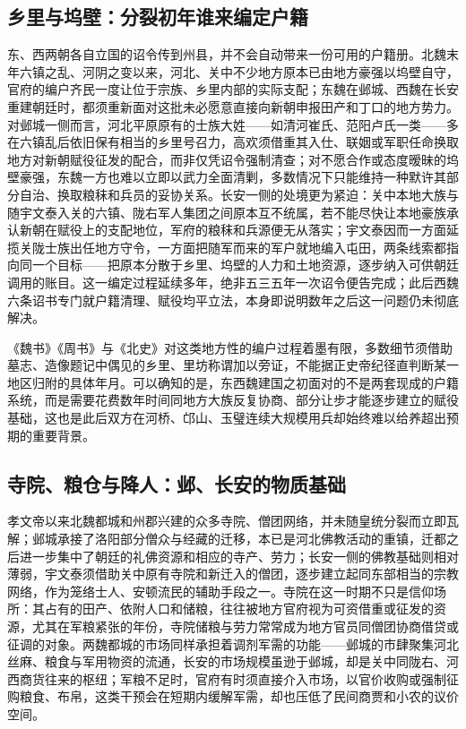 \subsection{乡里与坞壁：分裂初年谁来编定户籍}

东、西两朝各自立国的诏令传到州县，并不会自动带来一份可用的户籍册。北魏末年六镇之乱、河阴之变以来，河北、关中不少地方原本已由地方豪强以坞壁自守，官府的编户齐民一度让位于宗族、乡里内部的实际支配；东魏在邺城、西魏在长安重建朝廷时，都须重新面对这批未必愿意直接向新朝申报田产和丁口的地方势力。对邺城一侧而言，河北平原原有的士族大姓——如清河崔氏、范阳卢氏一类——多在六镇乱后依旧保有相当的乡里号召力，高欢须借重其入仕、联姻或军职任命换取地方对新朝赋役征发的配合，而非仅凭诏令强制清查；对不愿合作或态度暧昧的坞壁豪强，东魏一方也难以立即以武力全面清剿，多数情况下只能维持一种默许其部分自治、换取粮秣和兵员的妥协关系。长安一侧的处境更为紧迫：关中本地大族与随宇文泰入关的六镇、陇右军人集团之间原本互不统属，若不能尽快让本地豪族承认新朝在赋役上的支配地位，军府的粮秣和兵源便无从落实；宇文泰因而一方面延揽关陇士族出任地方守令，一方面把随军而来的军户就地编入屯田，两条线索都指向同一个目标——把原本分散于乡里、坞壁的人力和土地资源，逐步纳入可供朝廷调用的账目。这一编定过程延续多年，绝非五三五年一次诏令便告完成；此后西魏六条诏书专门就户籍清理、赋役均平立法，本身即说明数年之后这一问题仍未彻底解决。

《魏书》《周书》与《北史》对这类地方性的编户过程着墨有限，多数细节须借助墓志、造像题记中偶见的乡里、里坊称谓加以旁证，不能据正史帝纪径直判断某一地区归附的具体年月。可以确知的是，东西魏建国之初面对的不是两套现成的户籍系统，而是需要花费数年时间同地方大族反复协商、部分让步才能逐步建立的赋役基础，这也是此后双方在河桥、邙山、玉璧连续大规模用兵却始终难以给养超出预期的重要背景。

\subsection{寺院、粮仓与降人：邺、长安的物质基础}

孝文帝以来北魏都城和州郡兴建的众多寺院、僧团网络，并未随皇统分裂而立即瓦解；邺城承接了洛阳部分僧众与经藏的迁移，本已是河北佛教活动的重镇，迁都之后进一步集中了朝廷的礼佛资源和相应的寺产、劳力；长安一侧的佛教基础则相对薄弱，宇文泰须借助关中原有寺院和新迁入的僧团，逐步建立起同东部相当的宗教网络，作为笼络士人、安顿流民的辅助手段之一。寺院在这一时期不只是信仰场所：其占有的田产、依附人口和储粮，往往被地方官府视为可资借重或征发的资源，尤其在军粮紧张的年份，寺院储粮与劳力常常成为地方官员同僧团协商借贷或征调的对象。两魏都城的市场同样承担着调剂军需的功能——邺城的市肆聚集河北丝麻、粮食与军用物资的流通，长安的市场规模虽逊于邺城，却是关中同陇右、河西商货往来的枢纽；军粮不足时，官府有时须直接介入市场，以官价收购或强制征购粮食、布帛，这类干预会在短期内缓解军需，却也压低了民间商贾和小农的议价空间。

